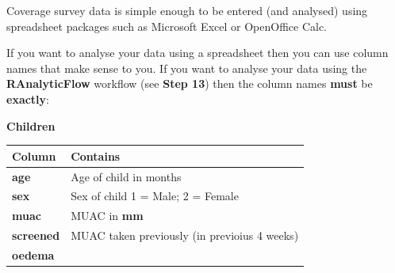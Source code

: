 \documentclass[12pt,a4paper]{book}
\theoremstyle{definition}
\theoremstyle{definition}
\theoremstyle{definition}
\theoremstyle{remark}
\begin{document}
Coverage survey data is simple enough to be entered (and analysed) using
spreadsheet packages such as Microsoft Excel or OpenOffice Calc.

If you want to analyse your data using a spreadsheet then you can use
column names that make sense to you. If you want to analyse your data
using the \textbf{RAnalyticFlow} workflow (see \textbf{Step 13}) then
the column names \textbf{must} be \textbf{exactly}:

\textbf{Children}

\begin{longtable}[]{@{}ll@{}}
\toprule
\begin{minipage}[b]{0.21\columnwidth}\raggedright
\textbf{Column}\strut
\end{minipage} & \begin{minipage}[b]{0.41\columnwidth}\raggedright
\textbf{Contains}\strut
\end{minipage}\tabularnewline
\midrule
\endhead
\begin{minipage}[t]{0.21\columnwidth}\raggedright
\textbf{age}\strut
\end{minipage} & \begin{minipage}[t]{0.41\columnwidth}\raggedright
Age of child in months\strut
\end{minipage}\tabularnewline
\begin{minipage}[t]{0.21\columnwidth}\raggedright
\textbf{sex}\strut
\end{minipage} & \begin{minipage}[t]{0.41\columnwidth}\raggedright
Sex of child 1 = Male; 2 = Female\strut
\end{minipage}\tabularnewline
\begin{minipage}[t]{0.21\columnwidth}\raggedright
\textbf{muac}\strut
\end{minipage} & \begin{minipage}[t]{0.41\columnwidth}\raggedright
MUAC in \textbf{mm}\strut
\end{minipage}\tabularnewline
\begin{minipage}[t]{0.21\columnwidth}\raggedright
\textbf{screened}\strut
\end{minipage} & \begin{minipage}[t]{0.41\columnwidth}\raggedright
MUAC taken previously (in previoius 4 weeks)\strut
\end{minipage}\tabularnewline
\begin{minipage}[t]{0.21\columnwidth}\raggedright
\textbf{oedema}\strut
\end{minipage} & \begin{minipage}[t]{0.41\columnwidth}\raggedright

\end{minipage}
\end{longtable}
\end{document}
